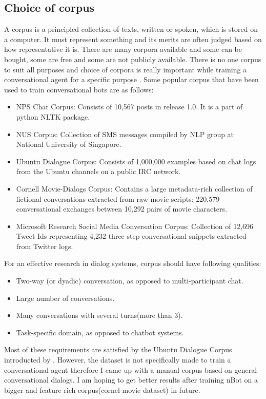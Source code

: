 \documentclass[letterpaper] {article} %
\begin{document}
\subsection{Choice of corpus}
A corpus is a principled collection of texts, written or spoken, which is stored on a computer. It must represent something and its
merits are often judged based on how representative it is. There are many corpora available and some can be bought, some are free and some are not publicly available. There is no one corpus to suit all purposes and choice of corpora is really important while training a conversational agent for a specific purpose \cite{o2007corpus}. Some popular corpus that have been used to train conversational bots are as follows:
\begin{itemize}
	\item NPS Chat Corpus: Consists of 10,567 posts in release 1.0. It is a part of python NLTK package.
	\item NUS Corpus: Collection of SMS messages compiled by NLP group at National University of Singapore.
	\item Ubuntu Dialogue Corpus: Consists of 1,000,000 examples based on chat logs from the Ubuntu channels on a public IRC network.
	\item Cornell Movie-Dialogs Corpus:  Contains a large metadata-rich collection of fictional conversations extracted from raw movie scripts: 220,579 conversational exchanges between 10,292 pairs of movie characters.
	\item Microsoft Research Social Media Conversation Corpus: Collection of 12,696 Tweet Ids representing 4,232 three-step conversational snippets extracted from Twitter logs.
\end{itemize}
For an effective research in dialog systems, corpus should have following qualities:
\begin{itemize}
	\item Two-way (or dyadic) conversation, as opposed to multi-participant chat.
	\item Large number of conversations.
	\item Many conversations with several turns(more than 3).
	\item Task-specific domain, as opposed to chatbot systems.
\end{itemize}
Most of these requirements are satisfied by the Ubuntu Dialogue Corpus introducted by \cite{lowe2015ubuntu}. However, the dataset is not specifically made to train a conversational agent therefore I came up with a manual corpus based on general conversational dialogs. I am hoping to get better results after training nBot on a bigger and feature rich corpus(cornel movie dataset) in future.
\end{document}
